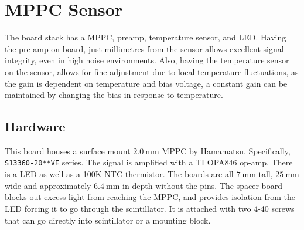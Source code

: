 \section{MPPC Sensor}

The board stack has a MPPC, preamp, temperature sensor, and LED. Having the pre-amp on board, just millimetres from the sensor allows excellent signal integrity, even in high noise environments. Also, having the temperature sensor on the sensor, allows for fine adjustment due to local temperature fluctuations, as the gain is dependent on temperature and bias voltage, a constant gain can be maintained by changing the bias in response to temperature.


\subsection{Hardware}
This board houses a surface mount $\SI{2.0}{\milli\meter}$ MPPC by Hamamatsu. Specifically, \texttt{S13360-20**VE} series. The signal is amplified with a TI OPA846 op-amp. There is a LED as well as a 100K NTC thermistor. The boards are all $\SI{7}{\milli\meter}$ tall, $\SI{25}{\milli\meter}$ wide and approximately $\SI{6.4}{\milli\meter}$ in depth without the pins. The spacer board blocks out excess light from reaching the MPPC, and provides isolation from the LED forcing it to go through the scintillator. It is attached with two 4-40 screws that can go directly into scintillator or a mounting block.

